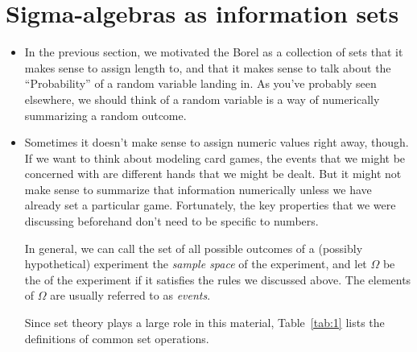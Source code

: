 \section{Sigma-algebras as information sets}

\begin{itemize}

\item In the previous section, we motivated the Borel \sigmaalgebra as a
  collection of sets that it makes sense to assign length to, and that
  it makes sense to talk about the ``Probability'' of a random
  variable landing in.  As you've probably seen elsewhere, we should
  think of a random variable is a way of numerically summarizing a
  random outcome.

\item Sometimes it doesn't make sense to assign numeric values right
  away, though.  If we want to think about modeling card games, the
  events that we might be concerned with are different hands that we
  might be dealt.  But it might not make sense to summarize that
  information numerically unless we have already set a particular
  game.  Fortunately, the key properties that we were discussing
  beforehand don't need to be specific to numbers.

  In general, we can call the set of all possible outcomes of a
  (possibly hypothetical) experiment the \emph{sample space} of the
  experiment, and let $\Omega$ be the \emph{\sigmaalgebra} of the experiment if
  it satisfies the rules we discussed above.  The elements of $\Omega$ are
  usually referred to as \emph{events}.

  Since set theory plays a large role in this material,
  Table~\ref{tab:1} lists the definitions of common set operations.


\end{itemize}
